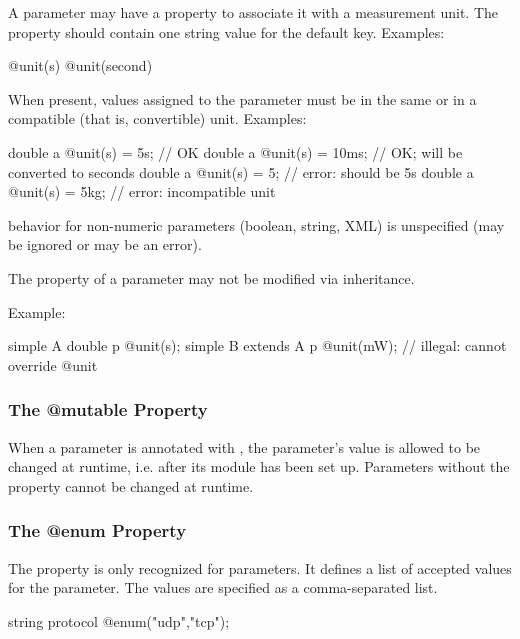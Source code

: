 A parameter may have a  property to associate it with a measurement
unit. The  property should contain one string value for the default
key. Examples:

\begin{ned}
@unit(s)
@unit(second)
\end{ned}

When present, values assigned to the parameter must be in the
same or in a compatible (that is, convertible) unit.
Examples:

\begin{ned}
  double a @unit(s) = 5s;   // OK
  double a @unit(s) = 10ms; // OK; will be converted to seconds
  double a @unit(s) = 5;    // error: should be 5s
  double a @unit(s) = 5kg;  // error: incompatible unit
\end{ned}

 behavior for non-numeric parameters (boolean, string, XML)
is unspecified (may be ignored or may be an error).

The  property of a parameter may not be modified via inheritance.

Example:
\begin{ned}
simple A {
    double p @unit(s);
}
simple B extends A {
    p @unit(mW);  // illegal: cannot override @unit
}
\end{ned}


\subsubsection{The @mutable Property}
\label{sec:ned-ref:mutable-property}

When a parameter is annotated with , the parameter's value is
allowed to be changed at runtime, i.e. after its module has been set up.
Parameters without the  property cannot be changed at runtime.


\subsubsection{The @enum Property}
\label{sec:ned-ref:enum-property}

The  property is only recognized for  parameters.
It defines a list of accepted values for the parameter. The values are specified
as a comma-separated list.

\begin{ned}
string protocol @enum("udp","tcp");
\end{ned}

